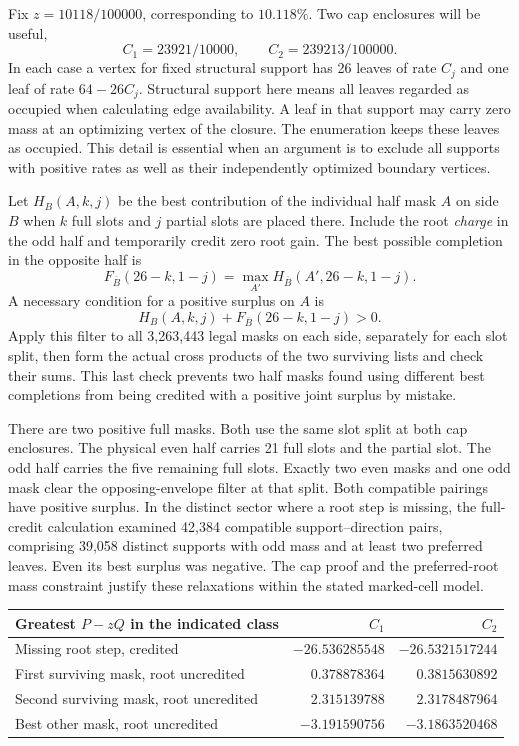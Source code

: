 Fix \(z=10118/100000\), corresponding to \(10.118\%\). Two cap enclosures will be useful,
\[
  C_1=23921/10000,\qquad C_2=239213/100000.
\]
In each case a vertex for fixed structural support has 26 leaves of rate \(C_j\) and one leaf of rate \(64-26C_j\). Structural support here means all leaves regarded as occupied when calculating edge availability. A leaf in that support may carry zero mass at an optimizing vertex of the closure. The enumeration keeps these leaves as occupied. This detail is essential when an argument is to exclude all supports with positive rates as well as their independently optimized boundary vertices.

Let \(H_B(A,k,j)\) be the best contribution of the individual half mask \(A\) on side \(B\) when \(k\) full slots and \(j\) partial slots are placed there. Include the root \emph{charge} in the odd half and temporarily credit zero root gain. The best possible completion in the opposite half is
\[
       F_{\overline B}(26-k,1-j)=
       \max_{A'} H_{\overline B}(A',26-k,1-j).
\]
A necessary condition for a positive surplus on \(A\) is
\[
        H_B(A,k,j)+F_{\overline B}(26-k,1-j)>0.
\]
Apply this filter to all 3,263,443 legal masks on each side, separately for each slot split, then form the actual cross products of the two surviving lists and check their sums. This last check prevents two half masks found using different best completions from being credited with a positive joint surplus by mistake.

There are two positive full masks. Both use the same slot split at both cap enclosures. The physical even half carries 21 full slots and the partial slot. The odd half carries the five remaining full slots. Exactly two even masks and one odd mask clear the opposing-envelope filter at that split. Both compatible pairings have positive surplus. In the distinct sector where a root step is missing, the full-credit calculation examined 42,384 compatible support--direction pairs, comprising 39,058 distinct supports with odd mass and at least two preferred leaves. Even its best surplus was negative. The cap proof and the preferred-root mass constraint justify these relaxations within the stated marked-cell model.

\begin{center}\small
\begin{tabular}{@{}lrr@{}}
\toprule
Greatest \(P-zQ\) in the indicated class & \(C_1\) & \(C_2\)\\
\midrule
Missing root step, credited & \(-26.536285548\) & \(-26.5321517244\)\\
First surviving mask, root uncredited & \(0.378878364\) & \(0.3815630892\)\\
Second surviving mask, root uncredited & \(2.315139788\) & \(2.3178487964\)\\
Best other mask, root uncredited & \(-3.191590756\) & \(-3.1863520468\)\\
\bottomrule
\end{tabular}
\end{center}

